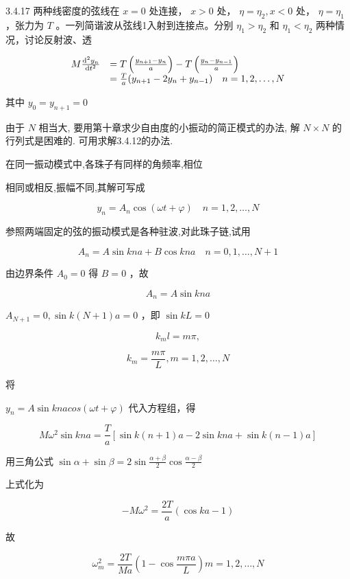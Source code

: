 \begin{problem}{3.4.17}
两种线密度的弦线在 $x = 0$ 处连接， $x > 0$ 处， $\eta = \eta_{2}, x < 0$ 处， $\eta = \eta_{1}$ ，张力为 $T$ 。一列简谐波从弦线1入射到连接点。分别 $\eta_{1} > \eta_{2}$ 和 $\eta_{1} < \eta_{2}$ 两种情况，讨论反射波、透

\[
\begin{array}{r l} M \frac {\mathrm{d} ^ {2} y _ {n}}{\mathrm{d} t ^ {2}} & = T \left(\frac {y _ {n + 1} - y _ {n}}{a}\right) - T \left(\frac {y _ {n} - y _ {n - 1}}{a}\right) \\ & = \frac {T}{a} (y _ {n + 1} - 2 y _ {n} + y _ {n - 1}) \quad n = 1, 2, \dots , N \end{array}
\]

其中 $y_0 = y_{n + 1} = 0$ 

由于 $N$ 相当大, 要用第十章求少自由度的小振动的简正模式的办法, 解 $N \times N$ 的行列式是困难的. 可用求解3.4.12的办法.

在同一振动模式中,各珠子有同样的角频率,相位

相同或相反,振幅不同,其解可写成

\[
y _ {n} = A _ {n} \cos (\omega t + \varphi) \quad n = 1, 2, \dots , N
\]

参照两端固定的弦的振动模式是各种驻波,对此珠子链,试用

\[
A _ {n} = A \sin k n a + B \cos k n a \quad n = 0, 1, \dots , N + 1
\]

由边界条件 $A_0 = 0$ 得 $B = 0$ ，故

\[
A _ {n} = A \sin k n a
\]

$A_{N + 1} = 0, \sin k(N + 1)a = 0$ ，即 $\sin kL = 0$ 

\[
k _ {m} l = m \pi ,
\]

\[
k _ {m} = \frac {m \pi}{L}, m = 1, 2, \dots , N
\]

将

$y_{n} = A\sin knacos(\omega t + \varphi)$ 代入方程组，得

\[
M \omega^ {2} \sin k n a = \frac {T}{a} [ \sin k (n + 1) a - 2 \sin k n a + \sin k (n - 1) a ]
\]

用三角公式 $\sin \alpha +\sin \beta = 2\sin \frac{\alpha + \beta}{2}\cos \frac{\alpha - \beta}{2}$ 

上式化为

\[
- M \omega^ {2} = \frac {2 T}{a} (\cos k a - 1)
\]

故

\[
\omega_ {m} ^ {2} = \frac {2 T}{M a} \left(1 - \cos \frac {m \pi a}{L}\right) m = 1, 2, \dots , N
\]


\end{problem}
